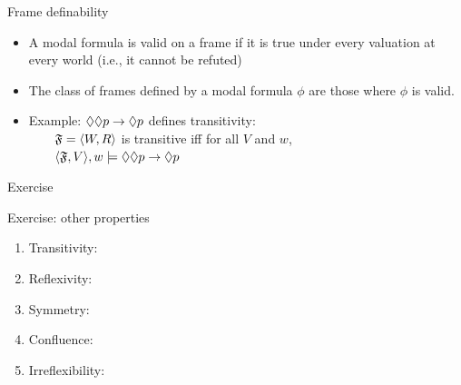 \documentclass{beamer}
\begin{document}
\begin{slide}{Frame definability}\label{s:32}
\small
\begin{itemize}
  \item A modal formula is valid on a frame if it is true under every valuation at every world (i.e., it cannot be refuted)
  \item The class of frames defined by a modal formula $\phi$ are those where $\phi$ is valid.
  \item Example: $\Diamond\Diamond p \to \Diamond p$ defines transitivity:\\
  ~~~~$\mathfrak{F}=\mathopen{\langle}W,R\mathclose{\rangle}$ is transitive iff for all $V$ and $w$,\\
  ~~~~$\mathopen{\langle}\mathfrak{F},V\mathclose{\rangle},w\models \Diamond\Diamond p \to \Diamond p $
\end{itemize}
\end{slide}
\begin{slide}{Exercise}\label{s:32}
\small

\begin{exampleblock}{Exercise: other properties}
\begin{enumerate}
  \item Transitivity: 
  \item Reflexivity: 
  \item Symmetry:    
  \item Confluence:  
  \item Irreflexibility:  
\end{enumerate}
\end{exampleblock}

\end{slide}

\end{document}

